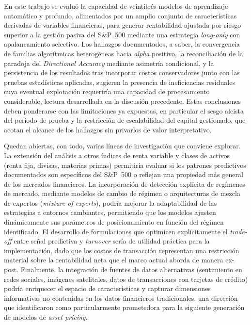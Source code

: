 ﻿\documentclass[11pt,a4paper]{article}
\begin{document}
En este trabajo se evalu\'o la capacidad de veintitr\'es modelos de aprendizaje autom\'atico y profundo, alimentados por un amplio conjunto de caracter\'isticas derivadas de variables financieras, para generar rentabilidad ajustada por riesgo superior a la gesti\'on pasiva del S\&P~500 mediante una estrategia \textit{long-only} con apalancamiento selectivo. Los hallazgos documentados, a saber, la convergencia de familias algor\'itmicas heterog\'eneas hacia \textit{alpha} positivo, la reconciliaci\'on de la paradoja del \textit{Directional Accuracy} mediante asimetr\'ia condicional, y la persistencia de los resultados tras incorporar costos conservadores junto con las pruebas estad\'isticas aplicadas, sugieren la presencia de ineficiencias residuales cuya eventual explotaci\'on requerir\'ia una capacidad de procesamiento considerable, lectura desarrollada en la discusi\'on precedente. Estas conclusiones deben ponderarse con las limitaciones ya expuestas, en particular el sesgo alcista del per\'iodo de prueba y la restricci\'on de escalabilidad del capital gestionado, que acotan el alcance de los hallazgos sin privarlos de valor interpretativo.

Quedan abiertas, con todo, varias l\'ineas de investigaci\'on que conviene explorar. La extensi\'on del an\'alisis a otros \'indices de renta variable y clases de activos (renta fija, divisas, materias primas) permitir\'ia evaluar si los patrones predictivos documentados son espec\'ificos del S\&P~500 o reflejan una propiedad m\'as general de los mercados financieros. La incorporaci\'on de detecci\'on expl\'icita de reg\'imenes de mercado, mediante modelos de cambio de r\'egimen o arquitecturas de mezcla de expertos (\textit{mixture of experts}), podr\'ia mejorar la adaptabilidad de las estrategias a entornos cambiantes, permitiendo que los modelos ajusten din\'amicamente sus par\'ametros de posicionamiento en funci\'on del r\'egimen identificado. El desarrollo de formulaciones que optimicen expl\'icitamente el \textit{trade-off} entre se\~nal predictiva y \textit{turnover} ser\'ia de utilidad pr\'actica para la implementaci\'on, dado que los costos de transacci\'on representan una restricci\'on material sobre la rentabilidad neta que el marco actual aborda de manera ex-post. Finalmente, la integraci\'on de fuentes de datos alternativas (sentimiento en redes sociales, im\'agenes satelitales, datos de transacciones con tarjetas de cr\'edito) podr\'ia enriquecer el espacio de caracter\'isticas y capturar dimensiones informativas no contenidas en los datos financieros tradicionales, una direcci\'on que \citet{gu2020} identificaron como particularmente prometedora para la siguiente generaci\'on de modelos de \textit{asset pricing}.
\end{document}

